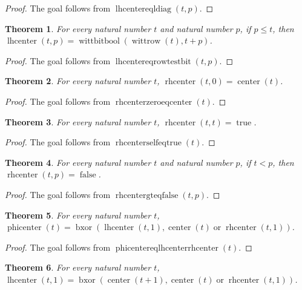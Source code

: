 \documentclass[11pt]{article}
\newtheorem{theorem}{Theorem}[section]
\theoremstyle{definition}
\begin{document}
\begin{proof}
The goal follows from \(\operatorname{lhcentereqldiag}(t, p)\).
\end{proof}
\begin{theorem}
\label{ll:paper:lhcenter-eq-row-testbit}
For every natural number \(t\) and natural number \(p\), if \(p \le t\), then \(\operatorname{lhcenter}(t, p) = \operatorname{wittbitbool}(\operatorname{wittrow}(t), t + p)\).
\end{theorem}
\begin{proof}
The goal follows from \(\operatorname{lhcentereqrowtestbit}(t, p)\).
\end{proof}
\begin{theorem}
\label{ll:paper:rhcenter-zero-eq-center}
For every natural number \(t\), \(\operatorname{rhcenter}(t, 0) = \operatorname{center}(t)\).
\end{theorem}
\begin{proof}
The goal follows from \(\operatorname{rhcenterzeroeqcenter}(t)\).
\end{proof}
\begin{theorem}
\label{ll:paper:rhcenter-self-eq-true}
For every natural number \(t\), \(\operatorname{rhcenter}(t, t) = \operatorname{true}\).
\end{theorem}
\begin{proof}
The goal follows from \(\operatorname{rhcenterselfeqtrue}(t)\).
\end{proof}
\begin{theorem}
\label{ll:paper:rhcenter-gt-eq-false}
For every natural number \(t\) and natural number \(p\), if \(t < p\), then \(\operatorname{rhcenter}(t, p) = \operatorname{false}\).
\end{theorem}
\begin{proof}
The goal follows from \(\operatorname{rhcentergteqfalse}(t, p)\).
\end{proof}
\begin{theorem}
\label{ll:paper:phicenter-eq-lhcenter-rhcenter}
For every natural number \(t\), \(\operatorname{phicenter}(t) = \operatorname{bxor}(\operatorname{lhcenter}(t, 1), \operatorname{center}(t) \operatorname{or} \operatorname{rhcenter}(t, 1))\).
\end{theorem}
\begin{proof}
The goal follows from \(\operatorname{phicentereqlhcenterrhcenter}(t)\).
\end{proof}
\begin{theorem}
\label{ll:paper:lhcenter-one-eq-of-center-fixed}
For every natural number \(t\), \(\operatorname{lhcenter}(t, 1) = \operatorname{bxor}(\operatorname{center}(t + 1), \operatorname{center}(t) \operatorname{or} \operatorname{rhcenter}(t, 1))\).
\end{theorem}
\end{document}
